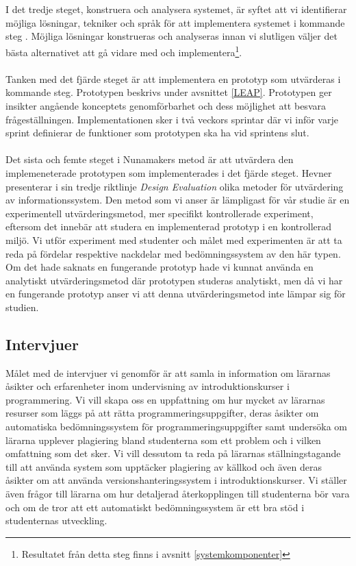 \documentclass[a4paper,11pt]{article}
\begin{document}
{\\
\\
I det tredje steget, konstruera och analysera systemet, är syftet att vi identifierar möjliga lösningar, tekniker och språk för att implementera systemet i kommande steg \cite{nunamaker}. Möjliga lösningar konstrueras och analyseras innan vi slutligen väljer det bästa alternativet att gå vidare med och implementera\footnote{Resultatet från detta steg finns i avsnitt \ref{systemkomponenter}}.
\\
\\
Tanken med det fjärde steget är att implementera en prototyp som utvärderas i kommande steg. Prototypen beskrivs under avsnittet \ref{LEAP}. Prototypen ger insikter angående konceptets genomförbarhet och dess möjlighet att besvara frågeställningen. Implementationen sker i två veckors sprintar där vi inför varje sprint definierar de funktioner som prototypen ska ha vid sprintens slut.
\\
\\
Det sista och femte steget i Nunamakers metod är att utvärdera den implemeneterade prototypen som implementerades i det fjärde steget. Hevner \cite{hevner} presenterar i sin tredje riktlinje \textit{Design Evaluation} olika metoder för utvärdering av informationssystem. Den metod som vi anser är lämpligast för vår studie är en experimentell utvärderingsmetod, mer specifikt kontrollerade experiment, eftersom det innebär att studera en implementerad prototyp i en kontrollerad miljö. Vi utför experiment med studenter och målet med experimenten är att ta reda på fördelar respektive nackdelar med bedömningssystem av den här typen. 
\\
Om det hade saknats en fungerande prototyp hade vi kunnat använda en analytiskt utvärderingsmetod där prototypen studeras analytiskt, men då vi har en fungerande prototyp anser vi att denna utvärderingsmetod inte lämpar sig för studien.

\newpage
\subsection{Intervjuer}\label{Intervjuer}

Målet med de intervjuer vi genomför är att samla in information om lärarnas åsikter och erfarenheter inom undervisning av introduktionskurser i programmering. Vi vill skapa oss en uppfattning om hur mycket av lärarnas resurser som läggs på att rätta programmeringsuppgifter, deras åsikter om automatiska bedömningssystem för programmeringsuppgifter samt undersöka om lärarna upplever plagiering bland studenterna som ett problem och i vilken omfattning som det sker. Vi vill dessutom ta reda på lärarnas ställningstagande till att använda system som upptäcker plagiering av källkod och även deras åsikter om att använda versionshanteringssystem i introduktionskurser. Vi ställer även frågor till lärarna om hur detaljerad återkopplingen till studenterna bör vara och om de tror att ett automatiskt bedömningssystem är ett bra stöd i studenternas utveckling.

}
\end{document}
